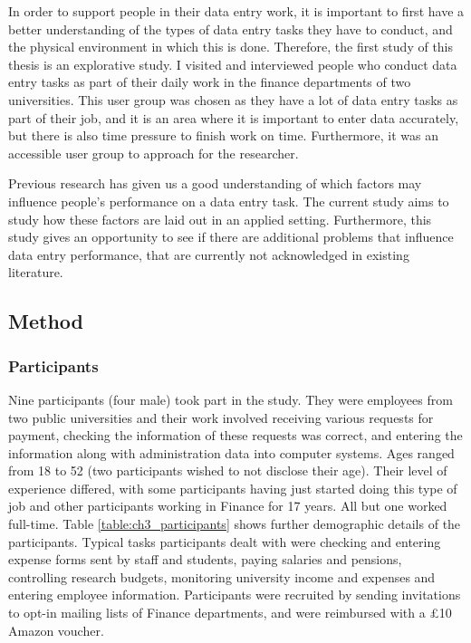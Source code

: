 In order to support people in their data entry work, it is important to first have a better understanding of the types of data entry tasks they have to conduct, and the physical environment in which this is done. Therefore, the first study of this thesis is an explorative study. I visited and interviewed people who conduct data entry tasks as part of their daily work in the finance departments of two universities. This user group was chosen as they have a lot of data entry tasks as part of their job, and it is an area where it is important to enter data accurately, but there is also time pressure to finish work on time. Furthermore, it was an accessible user group to approach for the researcher.

Previous research has given us a good understanding of which factors may influence people's performance on a data entry task. The current study aims to study how these factors are laid out in an applied setting. Furthermore, this study gives an opportunity to see if there are additional problems that influence data entry performance, that are currently not acknowledged in existing literature. 

\subsection{Method}
\subsubsection{Participants}
Nine participants (four male) took part in the study. They were employees from two public universities and their work involved receiving various requests for payment, checking the information of these requests was correct, and entering the information along with administration data into computer systems. Ages ranged from 18 to 52 (two participants wished to not disclose their age). Their level of experience differed, with some participants having just started doing this type of job and other participants working in Finance for 17 years. All but one worked full-time. Table \ref{table:ch3_participants} shows further demographic details of the participants. Typical tasks participants dealt with were checking and entering expense forms sent by staff and students, paying salaries and pensions, controlling research budgets, monitoring university income and expenses and entering employee information. Participants were recruited by sending invitations to opt-in mailing lists of Finance departments, and were reimbursed with a \pounds10 Amazon voucher.

